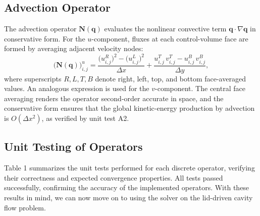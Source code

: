 \documentclass[
  aapm,
  amsmath,amssymb,
  reprint,          %
  floatfix
]{revtex4-2}
\begin{document}
\subsection{Advection Operator}

The advection operator $\mathbf{N}(\bm{q})$ evaluates the nonlinear convective term
$\bm{q}\cdot\nabla\bm{q}$ in conservative form. For the $u$-component, fluxes at each
control-volume face are formed by averaging adjacent velocity nodes:
\begin{equation}
  \bigl(\mathbf{N}(\bm{q})\bigr)^u_{i,j}
  = \frac{\bigl(u^R_{i,j}\bigr)^2 - \bigl(u^L_{i,j}\bigr)^2}{\Delta x}
  + \frac{u^T_{i,j}\,v^T_{i,j} - u^B_{i,j}\,v^B_{i,j}}{\Delta y},
\end{equation}
where superscripts $R,L,T,B$ denote right, left, top, and bottom face-averaged values.
An analogous expression is used for the $v$-component. The central face averaging
renders the operator second-order accurate in space, and the conservative form ensures
that the global kinetic-energy production by advection is $O(\Delta x^2)$, as verified
by unit test A2.

\subsection{Unit Testing of Operators}

Table 1 summarizes the unit tests performed for each discrete operator, verifying 
their correctness and expected convergence properties. All tests passed successfully, 
confirming the accuracy of the implemented operators. With these results in mind, 
we can now move on to using the solver on the lid-driven cavity flow problem. 
\end{document}

